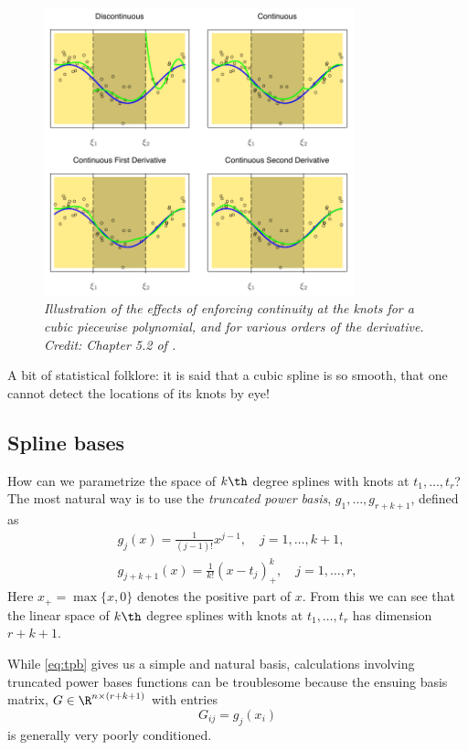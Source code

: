 \documentclass{article}
\begin{document}
\begin{figure}[tb]
\centering
\includegraphics[width=0.8\textwidth]{splines.pdf}
\caption{\it Illustration of the effects of enforcing continuity at the knots
  for a cubic piecewise polynomial, and for various orders of the derivative.
  Credit: Chapter 5.2 of \citet{hastie2009elements}.}    
\label{fig:splines}
\end{figure}

A bit of statistical folklore: it is said that a cubic spline is so smooth, that
one cannot detect the locations of its knots by eye! 

\subsection{Spline bases}

How can we parametrize the space of $k\th$ degree splines with knots at 
$t_1,\dots,t_r$?  The most natural way is to use the \emph{truncated power
  basis}, $g_1, \dots, g_{r+k+1}$, defined as   
\begin{equation}
\begin{gathered}
\label{eq:tpb}
g_j(x) = \frac{1}{(j-1)!} x^{j-1}, \quad j=1,\dots,k+1, \\
g_{j+k+1}(x) = \frac{1}{k!} (x-t_j)^k_+, \quad j=1,\dots,r,
\end{gathered}
\end{equation}
Here $x_+=\max\{x,0\}$ denotes the positive part of $x$. From this we can see
that the linear space of $k\th$ degree splines with knots at $t_1,\dots,t_r$ has 
dimension $r+k+1$.

While \eqref{eq:tpb} gives us a simple and natural basis, calculations involving
truncated power bases functions can be troublesome because the ensuing basis 
matrix, $G \in \R^{n \times (r+k+1)}$ with entries
\[
G_{ij} = g_j(x_i)
\]
is generally very poorly conditioned.
\end{document}
